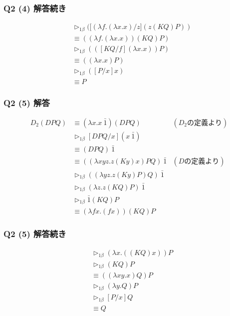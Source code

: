 \begin{frame}
    \frametitle{Q2 (4) 解答続き}
    \begin{align}
        &\triangleright_{1\beta} ([(\lambda f.(\lambda x.x)/z](z(KQ)P)) \\
        &\equiv ((\lambda f.(\lambda x.x))(KQ)P) \\
        &\triangleright_{1\beta} (([KQ/f](\lambda x.x))P) \\
        &\equiv ((\lambda x.x)P) \\
        &\triangleright_{1\beta} ([P/x]x) \\
        &\equiv P
    \end{align}
\end{frame}

\begin{frame}
    \frametitle{Q2 (5) 解答}
    \begin{align}
        D_2(DPQ) &\equiv (\lambda x.x\ \bar{1})(DPQ) & (D_2の定義より)\\
        &\triangleright_{1\beta} [DPQ/x](x\ \bar{1}) \\
        &\equiv (DPQ)\ \bar{1} \\
        &\equiv ((\lambda xyz.z(Ky)x)PQ)\ \bar{1} & (Dの定義より)\\
        &\triangleright_{1\beta} ((\lambda yz.z(Ky)P)Q)\ \bar{1} \\
        &\triangleright_{1\beta} (\lambda z.z(KQ)P)\ \bar{1} \\
        &\triangleright_{1\beta} \bar{1}(KQ)P \\
        &\equiv (\lambda fx.(fx))(KQ)P 
    \end{align}
\end{frame}

\begin{frame}
    \frametitle{Q2 (5) 解答続き}
    \begin{align}
        &\triangleright_{1\beta} (\lambda x.((KQ)x))P \\
        &\triangleright_{1\beta} (KQ)P \\
        &\equiv ((\lambda xy.x)Q)P \\
        &\triangleright_{1\beta} (\lambda y.Q)P \\
        &\triangleright_{1\beta} [P/x]Q \\
        &\equiv Q
    \end{align}
\end{frame}

